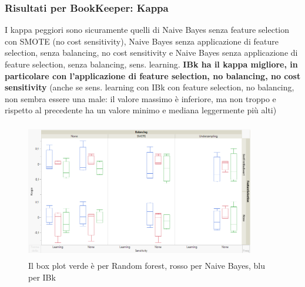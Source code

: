 \documentclass{beamer}
\begin{document}
\begin{frame}
	\frametitle{Risultati per BookKeeper: Kappa}
	
	\fontsize{7pt}{8pt}\selectfont
	
	I kappa peggiori sono sicuramente quelli di Naive Bayes 
	senza feature selection con SMOTE (no cost sensitivity), Naive Bayes senza
	applicazione di feature selection, senza balancing, no cost sensitivity e 
	Naive Bayes senza applicazione di feature selection, senza balancing, sens.
	learning.
	\textbf{IBk ha il kappa migliore, 
	in particolare con l'applicazione di feature 
	selection, no balancing, no cost sensitivity} 
	(anche se sens. learning con IBk con feature
	selection, no balancing, non sembra essere una
	male: il valore massimo è inferiore, ma non troppo e
	rispetto al precedente ha un
	valore minimo e mediana leggermente più alti)
	
	\centering
	\begin{figure}
	\includegraphics[width=10cm, height=6cm]{bookkeeper-kappa}
	\caption{Il box plot verde è per Random forest, rosso per Naive Bayes, blu per IBk}
	\end{figure}
\end{frame}
\end{document}
